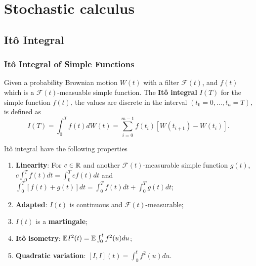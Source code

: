 \section{Stochastic calculus}

\subsection{It\^{o} Integral}

\subsubsection{It\^{o} Integral of Simple Functions}

\begin{definition}
Given a probability Brownian motion $W(t)$ with a filter $\mathcal{F}(t)$, and $f(t)$ which is a $\mathcal{F}(t)$-measuable simple
 function. The \textbf{It\^{o} integral} $I(T)$ for the simple function $f(t)$, the values are discrete in the interval $(t_0=0,\dots,t_n=T)$, is defined as
\begin{equation}
I(T)=\int_0^Tf(t)dW(t)=\sum_{i=0}^{m-1}f(t_i)[W(t_{i+1})-W(t_i)].
\end{equation}
\end{definition}

\begin{theorem}
It\^{o} integral have the following properties
\begin{enumerate}
\item \textbf{Linearity}: For $c\in\mathbb{R}$ and another $\mathcal{F}(t)$-measurable simple function $g(t)$, $c\int_0^T f(t)dt = \int_0^T cf(t)dt$ and $\int_0^T [f(t)+g(t)]dt = \int_0^T f(t)dt+\int_0^Tg(t)dt$;
\item \textbf{Adapted}: $I(t)$ is continuous and $\mathcal{F}(t)$-measurable;
\item $I(t)$ is a \textbf{martingale};
\item \textbf{It\^{o} isometry}: $\mathbb{E} I^2(t)=\mathbb{E} \int_0^tf^2(u)du$;
\item \textbf{Quadratic variation}: $[I,I](t)=\int_0^tf^2(u)du$.
\end{enumerate}
\end{theorem}

